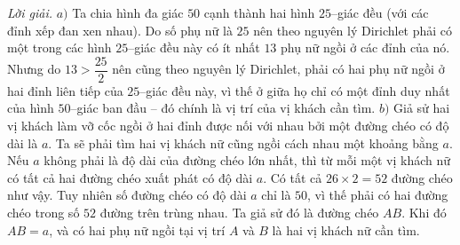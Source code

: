 \begin{multicols}{2}
	\textit{Lời giải.} $a)$	Ta chia hình đa giác $50$ cạnh thành hai hình $25$--giác đều (với các đỉnh xếp đan xen nhau). Do số phụ nữ là $25$ nên theo nguyên lý Dirichlet phải có một trong các hình $25$--giác đều này có ít nhất $13$ phụ nữ ngồi ở các đỉnh của nó. Nhưng do $13>\dfrac{25}{2}$ nên cũng theo nguyên lý Dirichlet, phải có hai phụ nữ ngồi ở hai đỉnh liên tiếp của $25$--giác đều này, vì thế ở giữa họ chỉ có một đỉnh duy nhất của hình $50$--giác ban đầu -- đó chính là vị trí của vị khách cần tìm.
	\vskip 0.1cm
	$b)$ Giả sử hai vị khách làm vỡ cốc ngồi ở hai đỉnh được nối với nhau bởi một đường chéo có độ dài là $a$. Ta sẽ phải tìm hai vị khách nữ cũng ngồi cách nhau một khoảng bằng $a$.
	\vskip 0.1cm
	Nếu $a$ không phải là độ dài của đường chéo lớn nhất, thì từ mỗi một vị khách nữ có tất cả hai đường chéo xuất phát có độ dài $a$. Có tất cả $26\times 2= 52$ đường chéo như vậy. Tuy nhiên số đường chéo có độ dài $a$ chỉ là $50$, vì thế phải có hai đường chéo trong số $52$ đường trên trùng nhau. Ta giả sử đó là đường chéo $AB$. Khi đó $AB=a$, và có hai phụ nữ ngồi tại vị trí $A$ và $B$ là hai vị khách nữ cần tìm.
\end{multicols}
\newpage
\begingroup
\thispagestyle{toancuabinone}
